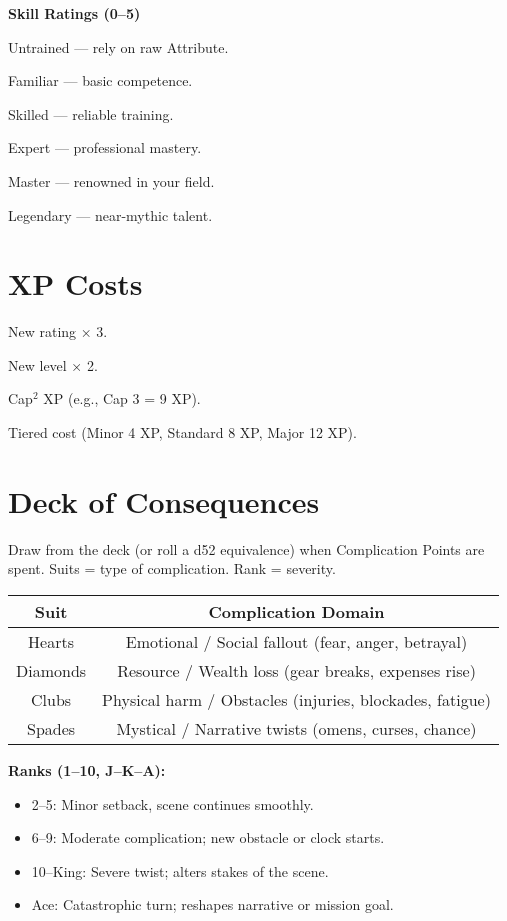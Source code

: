 \documentclass[12pt]{book}
\begin{document}
\textbf{Skill Ratings (0–5)}  
\begin{description}[leftmargin=2cm]
  \item[0] Untrained — rely on raw Attribute.  
  \item[1] Familiar — basic competence.  
  \item[2] Skilled — reliable training.  
  \item[3] Expert — professional mastery.  
  \item[4] Master — renowned in your field.  
  \item[5] Legendary — near-mythic talent.  
\end{description}

\section*{XP Costs}
\begin{description}[leftmargin=2cm]
  \item[Attributes] New rating × 3.  
  \item[Skills] New level × 2.  
  \item[Followers (On-Screen)] Cap$^2$ XP (e.g., Cap 3 = 9 XP).  
  \item[Off-Screen Assets] Tiered cost (Minor 4 XP, Standard 8 XP, Major 12 XP).  
\end{description}

\section*{Deck of Consequences}
Draw from the deck (or roll a d52 equivalence) when Complication Points are spent.  
Suits = type of complication. Rank = severity.

\begin{tabular}{|c|c|}
\hline
\textbf{Suit} & \textbf{Complication Domain} \\
\hline
Hearts & Emotional / Social fallout (fear, anger, betrayal) \\
\hline
Diamonds & Resource / Wealth loss (gear breaks, expenses rise) \\
\hline
Clubs & Physical harm / Obstacles (injuries, blockades, fatigue) \\
\hline
Spades & Mystical / Narrative twists (omens, curses, chance) \\
\hline
\end{tabular}

\medskip
\noindent
\textbf{Ranks (1–10, J–K–A):}  
\begin{itemize}
  \item 2–5: Minor setback, scene continues smoothly.  
  \item 6–9: Moderate complication; new obstacle or clock starts.  
  \item 10–King: Severe twist; alters stakes of the scene.  
  \item Ace: Catastrophic turn; reshapes narrative or mission goal.  
\end{itemize}
\end{document}
